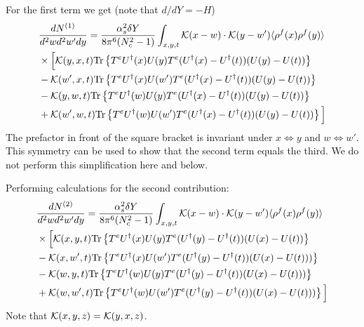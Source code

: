 \documentclass[aps,prd,amsmath,amssymb,nofootinbib]{revtex4-2}
\numberwithin{equation}{section}
\begin{document}
For the first term we get (note that $d/dY = - H$)
\begin{align}
    &\frac{dN^{(1)}}{d^2 w d^2 w' d y} = \frac{\alpha_s^2 \delta Y}{8 \pi^6 (N_c^2-1)}
\int_{x,y,t} {\cal K}(x-w)\cdot {\cal K}(y-w') \langle\rho^f(x) \rho^f(y) \rangle \notag \\ & \times  
\Big[ 
 {\cal K}(y,x,t) {\rm Tr} \left\{ T^e U^\dagger(x) U(y) T^e ( U^\dagger(x) - U^\dagger(t) )  ( U(y) - U(t) )\right\}
 \notag \\ & -  {\cal K}(w',x,t) {\rm Tr} \left\{ T^e U^\dagger(x) U(w') T^e ( U^\dagger(x) - U^\dagger(t) )  ( U(y) - U(t) )\right\}
 \notag \\ & -  {\cal K}(y,w,t) {\rm Tr} \left\{ T^e U^\dagger(w) U(y) T^e ( U^\dagger(x) - U^\dagger(t) )  ( U(y) - U(t) )\right\}
 \notag \\ & +  {\cal K}(w',w,t) {\rm Tr} \left\{ T^e U^\dagger(w) U(w') T^e ( U^\dagger(x) - U^\dagger(t) )  ( U(y) - U(t) )\right\}
\Big] 
\end{align}
The prefactor in front of the square bracket is invariant under $ x \Leftrightarrow y $ and $ w \Leftrightarrow w' $.  This symmetry can be used to show that the second term equals the third. We do not perform this simplification here and below. 

Performing calculations for the second contribution: 
\begin{align}
    &\frac{dN^{(2)}}{d^2 w d^2 w' d y} = \frac{\alpha_s^2 \delta Y}{8 \pi^6 (N_c^2-1)}
\int_{x,y,t} {\cal K}(x-w)\cdot {\cal K}(y-w') \langle\rho^f(x) \rho^f(y) \rangle \notag \\ & \times  
\Big[ 
 {\cal K}(x,y,t) {\rm Tr} \left\{ T^e U^\dagger(x) U(y) T^e ( U^\dagger(y) - U^\dagger(t) )  ( U(x) - U(t) )\right\}
 \notag \\ & -  {\cal K}(x, w',t) {\rm Tr} \left\{ T^e U^\dagger(x) U(w') T^e ( U^\dagger(y) - U^\dagger(t) )  ( U(x) - U(t) ))\right\}
 \notag \\ & -  {\cal K}(w,y,t) {\rm Tr} \left\{ T^e U^\dagger(w) U(y) T^e ( U^\dagger(y) - U^\dagger(t) )  ( U(x) - U(t) ) )\right\}
 \notag \\ & +  {\cal K}(w, w',t) {\rm Tr} \left\{ T^e U^\dagger(w) U(w') T^e ( U^\dagger(y) - U^\dagger(t) )  ( U(x) - U(t) ) )\right\}
\Big] 
\end{align} 
Note that ${\cal K}(x,y,z) = {\cal K}(y,x,z)$. 
\end{document}
